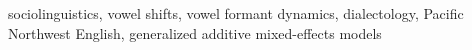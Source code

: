 \thispagestyle{empty}

\begin{list}{\textsc{Index words:\hfill}}{\leftmargin 1.4in}
  \item \begin{flushleft}
    sociolinguistics, vowel shifts, vowel formant dynamics, dialectology, Pacific Northwest English, generalized additive mixed-effects models
  \end{flushleft}
\end{list}
